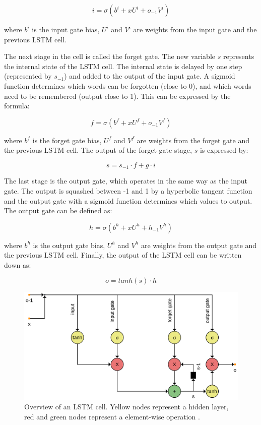 \documentclass[12pt]{book}
\begin{document}
	\begin{equation}
		i = \sigma (b^i + x U^i + o_{-1} V^i)
		\label{eq:inputgate}
	\end{equation}
	
	where $b^i$ is the input gate bias, $U^i$ and $V^i$ are weights from the input gate and the previous LSTM cell.
	
	The next stage in the cell is called the forget gate. The new variable $s$ represents the internal state of the LSTM cell. The internal state is delayed by one step (represented by $s_{-1}$) and added to the output of the input gate. A sigmoid function determines which words can be forgotten (close to 0), and which words need to be remembered (output close to 1). This can be expressed by the formula:
	
	\begin{equation}
		f = \sigma (b^f + x U^f + o_{-1} V^f)
		\label{eq:forgetgate}
	\end{equation}
	
	where $b^f$ is the forget gate bias, $U^f$ and $V^f$ are weights from the forget gate and the previous LSTM cell. 
	The output of the forget gate stage, $s$ is expressed by:
	
	\begin{equation}
		s = s_{-1} \cdot f + g \cdot i
	\end{equation}
	
	
	The last stage is the output gate, which operates in the same way as the input gate. The output is squashed between -1 and 1 by a hyperbolic tangent function and the output gate with a sigmoid function determines which values to output. The output gate can be defined as:
	
	\begin{equation}
		h = \sigma (b^h + x U^h + h_{-1} V^h)
		\label{eq:outgate}
	\end{equation}
	
	where $b^h$ is the output gate bias, $U^h$ and $V^h$ are weights from the output gate and the previous LSTM cell. 
	Finally, the output of the LSTM cell can be written down as:
	
	\begin{equation}
		o = tanh(s) \cdot h
		\label{eq:out}
	\end{equation}
	
	\begin{figure}
		\begin{center}
			\includegraphics[width=0.75\linewidth]{img/lstm.png}
		\end{center}
		\caption{Overview of an LSTM cell. Yellow nodes represent a hidden layer, red and green nodes represent a element-wise operation \cite{lstmtut}.}	
		\label{img:lstm}
	\end{figure}
	
\end{document}
